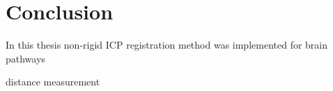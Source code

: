 \documentclass[../structure.tex]{subfiles}
\begin{document}
\chapter{Conclusion}
In this thesis non-rigid ICP registration method was implemented for brain pathways

distance measurement 
\end{document}
